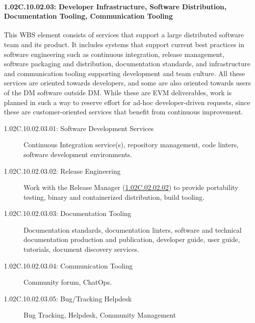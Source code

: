 \paragraph*{1.02C.10.02.03: Developer Infrastructure, Software Distribution, Documentation Tooling, Communication Tooling}

This WBS element consists of services that support a large distributed
software team and its product. It includes systems that support current
best practices in software engineering such as continuous integration,
release management, software packaging and distribution, documentation
standards, and infrastructure and communication tooling supporting
development and team culture. All these services are oriented towards
developers, and some are also oriented towards users of the DM software
outside DM. While these are EVM deliverables, work is planned in such a
way to reserve effort for ad-hoc developer-driven requests, since these
are customer-oriented services that benefit from continuous improvement.

\begin{description}

\item[1.02C.10.02.03.01: Software Development Services]
  Continuous Integration service(s), repository management, code linters,
  software development environments.

\item[1.02C.10.02.03.02: Release Engineering]
  Work with the Release Manager
  (\hyperref[wbs:1.02C.02.02.02]{1.02C.02.02.02}) to provide portability
  testing, binary and containerized distribution, build tooling.

\item[1.02C.10.02.03.03: Documentation Tooling]
  Documentation standards, documentation linters, software and technical
  documentation production and publication, developer guide, user guide,
  tutorials, document discovery services.

\item[1.02C.10.02.03.04: Communication Tooling]
  Community forum, ChatOps.

\item[1.02C.10.02.03.05: Bug/Tracking Helpdesk]
  Bug Tracking, Helpdesk, Community Management

\end{description}
